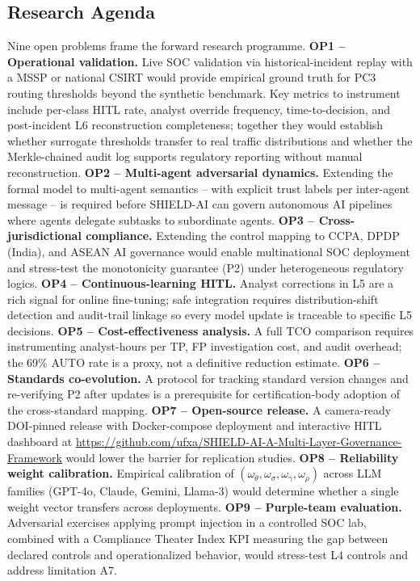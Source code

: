\documentclass[journal]{IEEEtran}
\begin{document}
\subsection{Research Agenda}
\label{ssec:agenda}
Nine open problems frame the forward research programme.
\textbf{OP1 -- Operational validation.}
Live SOC validation via historical-incident replay with a MSSP or national CSIRT would provide
empirical ground truth for PC3 routing thresholds beyond the synthetic benchmark.
Key metrics to instrument include per-class HITL rate, analyst override frequency,
time-to-decision, and post-incident L6 reconstruction completeness; together they would
establish whether surrogate thresholds transfer to real traffic distributions and whether
the Merkle-chained audit log supports regulatory reporting without manual reconstruction.
\textbf{OP2 -- Multi-agent adversarial dynamics.}
Extending the formal model to multi-agent semantics \cite{owasp2025agentic,lga2026} --
with explicit trust labels per inter-agent message -- is required before SHIELD-AI can
govern autonomous AI pipelines where agents delegate subtasks to subordinate agents.
\textbf{OP3 -- Cross-jurisdictional compliance.}
Extending the control mapping to CCPA, DPDP (India), and ASEAN AI governance would
enable multinational SOC deployment and stress-test the monotonicity guarantee (P2)
under heterogeneous regulatory logics.
\textbf{OP4 -- Continuous-learning HITL.}
Analyst corrections in L5 are a rich signal for online fine-tuning; safe integration
requires distribution-shift detection and audit-trail linkage so every model update is
traceable to specific L5 decisions.
\textbf{OP5 -- Cost-effectiveness analysis.}
A full TCO comparison requires instrumenting analyst-hours per TP, FP investigation cost,
and audit overhead; the 69\% AUTO rate is a proxy, not a definitive reduction estimate.
\textbf{OP6 -- Standards co-evolution.}
A protocol for tracking standard version changes and re-verifying P2 after updates is a
prerequisite for certification-body adoption of the cross-standard mapping.
\textbf{OP7 -- Open-source release.}
A camera-ready DOI-pinned release with Docker-compose deployment and interactive HITL
dashboard at
\url{https://github.com/ufxa/SHIELD-AI-A-Multi-Layer-Governance-Framework}
would lower the barrier for replication studies.
\textbf{OP8 -- Reliability weight calibration.}
Empirical calibration of $(\omega_\theta, \omega_\sigma, \omega_\gamma, \omega_\rho)$
across LLM families (GPT-4o, Claude, Gemini, Llama-3) would determine whether a single
weight vector transfers across deployments.
\textbf{OP9 -- Purple-team evaluation.}
Adversarial exercises applying prompt injection \cite{greshake2023indirect,zou2023universal}
in a controlled SOC lab, combined with a Compliance Theater Index KPI measuring the gap
between declared controls and operationalized behavior, would stress-test L4 controls
and address limitation A7.
\end{document}
